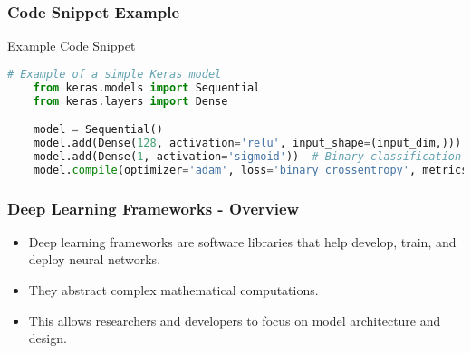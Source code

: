 \documentclass[aspectratio=169]{beamer}
\begin{document}
\begin{frame}[fragile]
    \frametitle{Code Snippet Example}
    \begin{block}{Example Code Snippet}
    \begin{lstlisting}[language=Python]
    # Example of a simple Keras model
    from keras.models import Sequential
    from keras.layers import Dense

    model = Sequential()
    model.add(Dense(128, activation='relu', input_shape=(input_dim,)))
    model.add(Dense(1, activation='sigmoid'))  # Binary classification
    model.compile(optimizer='adam', loss='binary_crossentropy', metrics=['accuracy'])
    \end{lstlisting}
    \end{block}
\end{frame}

\begin{frame}[fragile]
    \frametitle{Deep Learning Frameworks - Overview}
    \begin{itemize}
        \item Deep learning frameworks are software libraries that help develop, train, and deploy neural networks.
        \item They abstract complex mathematical computations.
        \item This allows researchers and developers to focus on model architecture and design.
    \end{itemize}
\end{frame}
\end{document}
